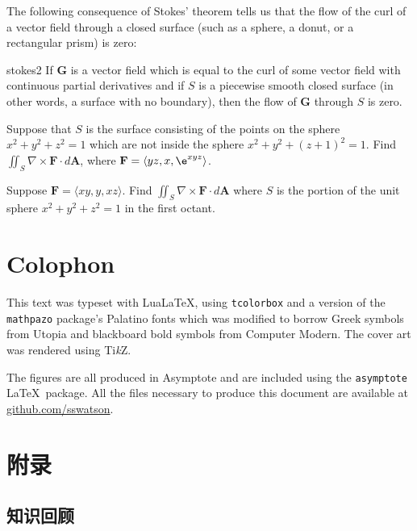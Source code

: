 \documentclass[indent]{watsonbook}
\begin{document}
The following consequence of Stokes' theorem tells us that the flow
of the curl of a vector field through a closed surface (such as a
sphere, a donut, or a rectangular prism) is zero:

\begin{obs}{}{stokes2}
  If $\mathbf{G}$ is a vector field which is equal to the curl of
  some vector field with continuous partial derivatives and if $S$
  is a piecewise smooth closed surface (in other words, a surface
  with no boundary), then the flow of $\mathbf{G}$ through $S$ is
  zero.
\end{obs}

\begin{exercise}{}{}
  Suppose that $S$ is the surface consisting of the points on the
  sphere $x^2 + y^2 + z^2 = 1$ which are not inside the sphere
  $x^2 + y^2 + (z+1)^2 = 1$. Find $\iint_{S} \nabla \times \mathbf{F}
  \cdot {d}\mathbf{A}$, where $\mathbf{F} = \langle yz, x, \e^{xyz}
  \rangle$.
\end{exercise}

\begin{exercise}{}{}
  Suppose $\mathbf{F} = \langle xy, y, xz \rangle$. Find
  $\iint_S \nabla \times \mathbf{F} \cdot {d}\mathbf{A}$ where $S$ is
  the portion of the unit sphere $x^2 + y^2 + z^2 = 1$ in the first
  octant.
\end{exercise}

\chapter*{Colophon}

This text was typeset with Lua\LaTeX, using \texttt{tcolorbox} and a version of the \texttt{mathpazo} package's Palatino fonts which was modified to borrow Greek symbols from Utopia and blackboard bold symbols from Computer Modern. The cover art was rendered using Ti\textit{k}Z.

The figures are all produced in Asymptote and are included using the
\texttt{asymptote} \LaTeX\ package. All the files necessary to produce
this document are available at \url{github.com/sswatson}.

\appendix

\chapter{附\quad 录}

\section{知识回顾}
\end{document}
